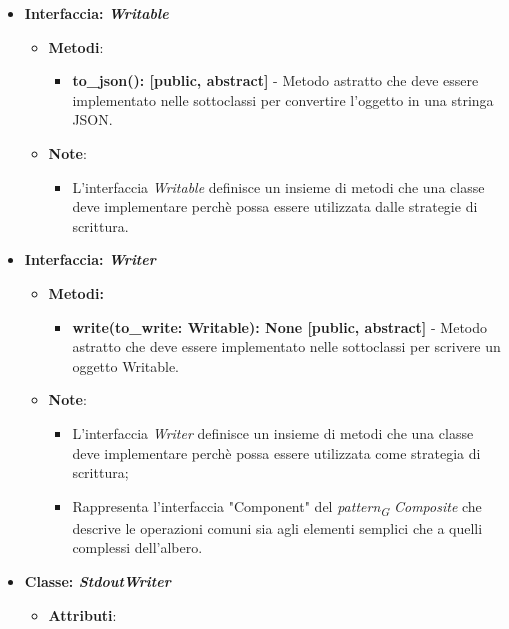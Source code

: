 \begin{itemize}
    \item{\textbf{Interfaccia: \textit{Writable}}}
    \begin{itemize}
        \item\textbf{Metodi}: 
        \begin{itemize}
            \item \textbf{to\_json(): [public, abstract]} - Metodo astratto che deve essere implementato nelle sottoclassi per convertire l'oggetto in una stringa JSON.
        \end{itemize}
        \item\textbf{Note}:
        \begin{itemize}
            \item L'interfaccia \textit{Writable} definisce un insieme di metodi che una classe deve implementare perchè possa essere utilizzata dalle strategie di scrittura.
        \end{itemize}
    \end{itemize}
    \item{\textbf{Interfaccia: \textit{Writer}}}
     \begin{itemize}
        \item \textbf{Metodi:}
         \begin{itemize}
            \item \textbf{write(to\_write: Writable): None [public, abstract]} - Metodo astratto che deve essere implementato nelle sottoclassi per scrivere un oggetto Writable.
        \end{itemize}
        \item\textbf{Note}:
        \begin{itemize}
            \item L'interfaccia \textit{Writer} definisce un insieme di metodi che una classe deve implementare perchè possa essere utilizzata come strategia di scrittura;
            \item Rappresenta l'interfaccia "Component" del \textit{pattern}\textsubscript{\textit{G}} \textit{Composite} che descrive le operazioni comuni sia agli elementi semplici che a quelli complessi dell'albero.
        \end{itemize}
    \end{itemize}
    \item{\textbf{Classe: \textit{StdoutWriter}}}
    \begin{itemize}
    \item\textbf{Attributi}:
        \begin{itemize}

\end{itemize}
\end{itemize}
\end{itemize}
